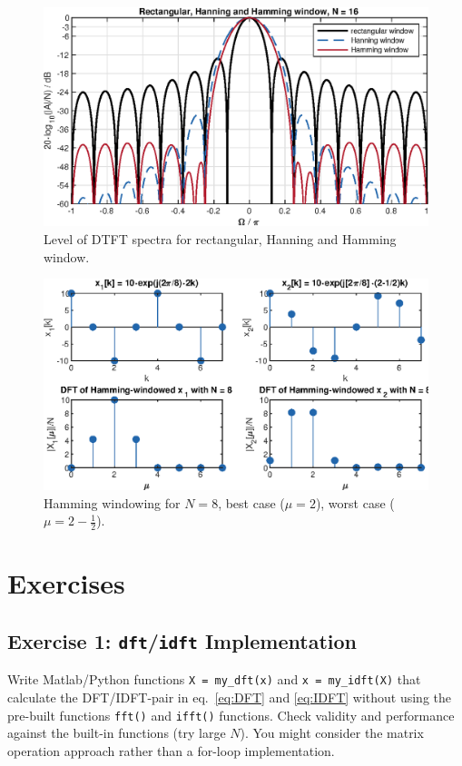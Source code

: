 \documentclass[11pt,a4paper,DIV=12]{scrartcl}
\begin{document}
\begin{figure}
		\centering
		\includegraphics[]{graphics/DTFTRectHanningHammingWin_log}
		\caption{Level of DTFT spectra for rectangular, Hanning and Hamming
		window.}
		\label{DTFTRectHanningHammingWin_log}
\end{figure}
\begin{figure}
		\centering
		\includegraphics[]{graphics/DFTbestworstcase_HammWin}
		\caption{Hamming windowing for $N=8$, best case ($\mu=2$),
		worst case ($\mu=2-\frac{1}{2}$).}
		\label{DFTbestworstcase_HammWin}
\end{figure}

\section{Exercises}

\subsection*{Exercise 1: \texttt{dft}/\texttt{idft} Implementation}
Write Matlab/Python functions \texttt{X = my\_dft(x)} and \texttt{x = my\_idft(X)}
that calculate the DFT/IDFT-pair in eq.~\eqref{eq:DFT} and \eqref{eq:IDFT}
without using the pre-built functions \texttt{fft()} and \texttt{ifft()}
functions.
%
Check validity and performance against the built-in functions (try large $N$).
%
You might consider the matrix operation approach rather than a for-loop
implementation.
\end{document}
